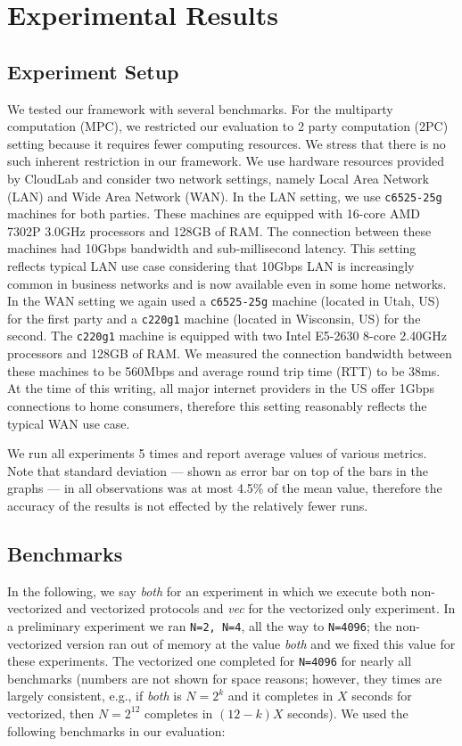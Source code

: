 \section{Experimental Results}
\label{sec:results}

\subsection{Experiment Setup}\label{sec:experiment_setup}
We tested our framework with several benchmarks. For the multiparty computation (MPC), we restricted our evaluation to 2 party computation (2PC) setting because it requires fewer computing resources. We stress that there is no such inherent restriction in our framework. We use hardware resources provided by CloudLab\cite{DuplyakinATC19} and consider two network settings, namely Local Area Network (LAN) and Wide Area Network (WAN). In the LAN setting, we use {\tt c6525-25g} machines for both parties. These machines are equipped with 16-core AMD 7302P 3.0GHz processors and 128GB of RAM. The connection between these machines had 10Gbps bandwidth and sub-millisecond latency. This setting reflects typical LAN use case considering that 10Gbps LAN is increasingly common in business networks and is now available even in some home networks. In the WAN setting we again used a {\tt c6525-25g} machine (located in Utah, US) for the first party and a {\tt c220g1} machine (located in Wisconsin, US) for the second. The {\tt c220g1} machine is equipped with two Intel E5-2630 8-core 2.40GHz processors and 128GB of RAM. We measured the connection bandwidth between these machines to be 560Mbps and average round trip time (RTT) to be 38ms. At the time of this writing, all major internet providers in the US offer 1Gbps connections to home consumers, therefore this setting reasonably reflects the typical WAN use case.

We run all experiments 5 times and report average values of various metrics. Note that standard deviation --- shown as error bar on top of the bars in the graphs --- in all observations was at most 4.5\% of the mean value, therefore the accuracy of the results is not effected by the relatively fewer runs.

\subsection{Benchmarks}\label{sec:benchmarks_description}
In the following, we say {\em both} for an experiment in which we execute both non-vectorized and vectorized protocols and {\em vec} for the vectorized only experiment. 
In a preliminary experiment we ran {\tt N=2, N=4}, all the way to {\tt N=4096}; the non-vectorized version ran out of memory at the value {\em both} and we fixed this value for these experiments. The vectorized one completed for {\tt N=4096} for nearly all benchmarks (numbers are not shown for space reasons; however, they times are largely consistent, e.g., if {\em both} is $N = 2^k$ and it completes in $X$ seconds for vectorized, then $N = 2^{12}$ completes in $(12-k)X$ seconds).
We used the following benchmarks in our evaluation:

